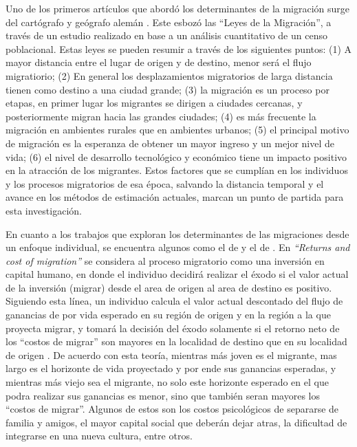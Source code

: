 \documentclass[12pt,a4paper]{article}
\begin{document}
Uno de los primeros artículos que abordó los determinantes de la migración surge del cartógrafo y geógrafo alemán \textcite{ravenstein_laws_1885}. Este esbozó las ``Leyes de la Migración'', a través de un estudio realizado en base a un análisis cuantitativo de un censo poblacional. Estas leyes se pueden resumir a través de los siguientes puntos: (1) A mayor distancia entre el lugar de origen y de destino, menor será el flujo migratiorio; (2) En general los desplazamientos migratorios de larga distancia tienen como destino a una ciudad grande; (3) la migración es un proceso por etapas, en primer lugar los migrantes se dirigen a ciudades cercanas, y posteriormente migran hacia las grandes ciudades; (4) es más frecuente la migración en ambientes rurales que en ambientes urbanos; (5) el principal motivo de migración es la esperanza de obtener un mayor ingreso y un mejor nivel de vida; (6) el nivel de desarrollo tecnológico y económico tiene un impacto positivo en la atracción de los migrantes. Estos factores que se cumplían en  los individuos y los procesos migratorios de esa época, salvando la distancia temporal y el avance en los métodos de estimación actuales, marcan un punto de partida para esta investigación.

En cuanto a los trabajos que exploran los determinantes de las migraciones desde un enfoque individual, se encuentra algunos como el de \textcite{sjaastad_costs_1962} y el de \textcite{todaro_model_1969}. En \textit{``Returns and cost of migration''} \parencite{sjaastad_costs_1962} se considera al proceso migratorio como una inversión en capital humano, en donde el individuo decidirá realizar el éxodo si el valor actual de la inversión (migrar) desde el area de origen al area de destino es positivo.  Siguiendo esta línea, un individuo calcula el valor actual descontado del flujo de ganancias de por vida esperado en su región de origen y en la región a la que proyecta migrar, y tomará la decisión del éxodo solamente si el retorno neto de los ``costos de migrar'' son mayores en la localidad de destino que en su localidad de origen \parencite{zaiceva_impact_2014}. De acuerdo con esta teoría, mientras más joven es el migrante, mas largo es el horizonte de vida proyectado y por ende sus ganancias esperadas, y mientras más viejo sea el migrante, no solo este horizonte esperado en el que podra realizar sus ganancias es menor, sino que también seran mayores  los ``costos de migrar''. Algunos de estos son los costos psicológicos de separarse de familia y amigos, el mayor capital social que deberán dejar atras, la dificultad de integrarse en una nueva cultura, entre otros.
\end{document}
